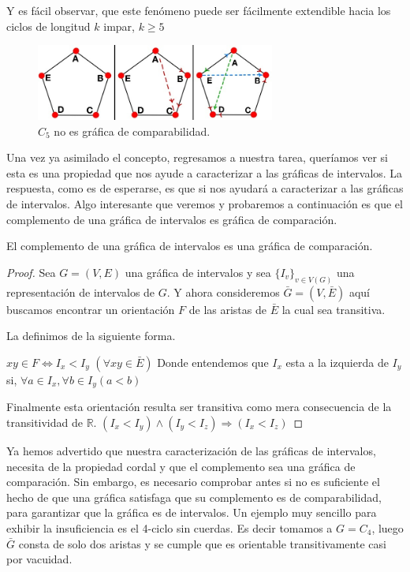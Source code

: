 Y es fácil observar, que este fenómeno puede ser fácilmente extendible hacia los
ciclos de longitud $k$ impar, $k\geq 5$

\begin{figure}[H]
  \centering
  \includegraphics[width=0.7\textwidth]{recursos/capturas/207.jpg}
  \caption{$C_5$ no es gráfica de comparabilidad.}
  \label{fig:207}
\end{figure}

Una vez ya asimilado el concepto, regresamos a nuestra tarea, queríamos ver si
esta es una propiedad que nos ayude a caracterizar a las gráficas de intervalos.
La respuesta, como es de esperarse, es que si nos ayudará a caracterizar a las
gráficas de intervalos. Algo interesante que veremos y probaremos a continuación
es que el complemento de una gráfica de intervalos es gráfica de comparación.

\begin{teorema}
    \label{teo:Int-Comprbldd}
    El complemento de una gráfica de intervalos es una gráfica de comparación.
\end{teorema}

\begin{proof}
    Sea $G=(V,E)$ una gráfica de intervalos y sea $\{I_v \}_{v\in V(G)}$ una
    representación de intervalos de $G$. Y ahora consideremos $ \bar{G} =(V,
    \bar{E})$ aquí buscamos encontrar un orientación $F$ de las aristas de
    $\bar{E}$ la cual sea transitiva.
    
    La definimos de la siguiente forma.
    
    $xy\in F \iff I_x<I_y$ $(\forall xy\in \bar{E})$ Donde entendemos que $I_x$
    esta a la izquierda de $I_y$ si, $\forall a\in I_x, \forall b \in I_y(a<b)$

    Finalmente esta orientación resulta ser transitiva como mera consecuencia de
    la transitividad de $\mathbb{R}$. $(I_x < I_y) \wedge (I_y < I_z)
    \Rightarrow (I_x<I_z) $
\end{proof}

Ya hemos advertido que nuestra caracterización de las gráficas de intervalos,
necesita de la propiedad cordal y que el complemento sea una gráfica de
comparación. Sin embargo, es necesario comprobar antes si no es suficiente el
hecho de que una gráfica satisfaga que su complemento es de comparabilidad, para
garantizar que la gráfica es de intervalos. Un ejemplo muy sencillo para exhibir
la insuficiencia es el 4-ciclo sin cuerdas. Es decir tomamos a $G=C_4$, luego
$\bar{G}$ consta de solo dos aristas y se cumple que es orientable
transitivamente casi por vacuidad.

